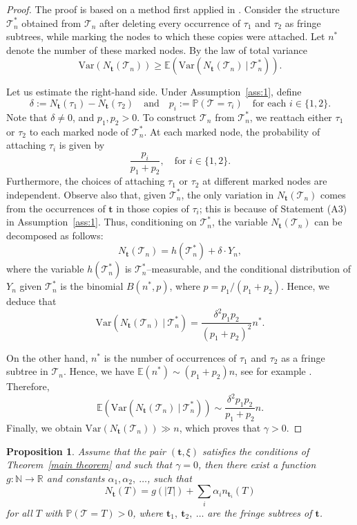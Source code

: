 \documentclass[article]{amsart}
\newcommand{\tc}{\mathcal{T}}
\newcommand{\st}{\textbf{t}}
\newtheorem{proposition}[theorem]{Proposition}
\theoremstyle{definition}
\theoremstyle{remark}
\begin{document}
\begin{proof}
    The proof is based on a method first applied in \cite[Subsection 6.1]{ralaivaosaona2020}. Consider the structure $\tc_n^*$ obtained from $\tc_n$ after deleting every occurrence of $\tau_1$ and $\tau_2$ as fringe subtrees, while marking the nodes to which these copies were attached. Let $n^*$ denote the number of these marked nodes. By the law of total variance 
    \[
    \mathrm{Var}(N_{\st}(\tc_n))\geq \mathbb{E}\left(\mathrm{Var}(N_{\st}(\tc_n)\ |\ \tc_n^*)\right). 
    \]

Let us estimate the right-hand side. Under Assumption~\ref{ass:1}, define
\[
\delta := N_{\st}(\tau_1) - N_{\st}(\tau_2)
\quad \text{and} \quad
p_i := \mathbb{P}(\tc = \tau_i) \quad \text{for each } i \in \{1, 2\}.
\]
Note that $\delta\neq 0$, and $p_1, p_2>0$. To construct \( \tc_n \) from \( \tc_n^* \), we reattach either \( \tau_1 \) or \( \tau_2 \) to each marked node of \( \tc_n^* \). At each marked node, the probability of attaching \( \tau_i \) is given by
\[
\frac{p_i}{p_1 + p_2}, \quad \text{for } i \in \{1, 2\}.
\]
Furthermore, the choices of attaching \( \tau_1 \) or \( \tau_2 \) at different marked nodes are independent. Observe also that, given $\tc_n^*$, the only variation in $N_{\st}(\tc_n)$ comes from the occurrences of $\st$ in those copies of $\tau_i$; this is because of Statement (A3) in Assumption~\ref{ass:1}. Thus, conditioning on $\tc_n^*$, the variable $N_{\st}(\tc_n)$ can be decomposed as follows:
    \[
    N_{\st}(\tc_n)=h(\tc_n^*)+\delta \cdot Y_n,
    \]
    where the variable $h(\tc_n^*)$ is $\tc_n^*$--measurable, and the conditional distribution of $Y_n$ given $\tc_n^*$ is the binomial $ B(n^*,p)$, where $p=p_1/(p_1+p_2)$. Hence, we deduce that 
    \[
    \mathrm{Var}(N_{\st}(\tc_n)\ |\ \tc_n^*)=\frac{\delta^2 p_1p_2}{(p_1+p_2)^2} n^*.
    \]
    
    On the other hand, $n^*$ is the number of occurrences of $\tau_1$ and $\tau_2$ as a fringe subtree in $\tc_n$. Hence,  we have $\mathbb{E}(n^*)\sim (p_1+p_2)n$, see for example \cite[Theorem 1.3]{J16}. Therefore, 
    \[
    \mathbb{E}\left(\mathrm{Var}(N_{\st}(\tc_n)\ |\ \tc_n^*)\right)\sim \frac{\delta^2 p_1p_2}{p_1+p_2} n.
    \]
    Finally, we obtain $\mathrm{Var}(N_{\st}(\tc_n))\gg n$, which proves that $\gamma> 0$.
\end{proof}

\begin{proposition}\label{prop:lin}
    Assume that the pair $(\st,\xi)$ satisfies the conditions of Theorem~\ref{main theorem} and such that $\gamma= 0$, then there exist a function $g:\mathbb{N}\to \mathbb{R}$ and constants $\alpha_1, \alpha_2,\ \ldots$, such that 
    \[
    N_{\st}(T)=g(|T|)+\sum_{i}\alpha_i n_{\st_i}(T)
    \]
    for all $T$ with $\mathbb{P}(\tc=T)>0$, where $\st_1,\ \st_2,\ \ldots$ are the fringe subtrees of $\st$.
\end{proposition}
    
\end{document}
